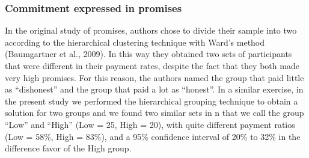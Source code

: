\documentclass[12pt,]{article}
\begin{document}
\hypertarget{commitment-expressed-in-promises}{%
\subsubsection{Commitment expressed in
promises}\label{commitment-expressed-in-promises}}

In the original study of promises, authors chose to divide their sample
into two according to the hierarchical clustering technique with Ward's
method (Baumgartner et al., 2009). In this way they obtained two sets of
participants that were different in their payment rates, despite the
fact that they both made very high promises. For this reason, the
authors named the group that paid little as ``dishonest'' and the group
that paid a lot as ``honest''. In a similar exercise, in the present
study we performed the hierarchical grouping technique to obtain a
solution for two groups and we found two similar sets in n that we call
the group ``Low'' and ``High'' (Low = 25, High = 20), with quite
different payment ratios (Low = 58\%, High = 83\%), and a 95\%
confidence interval of 20\% to 32\% in the difference favor of the High
group.
\end{document}
